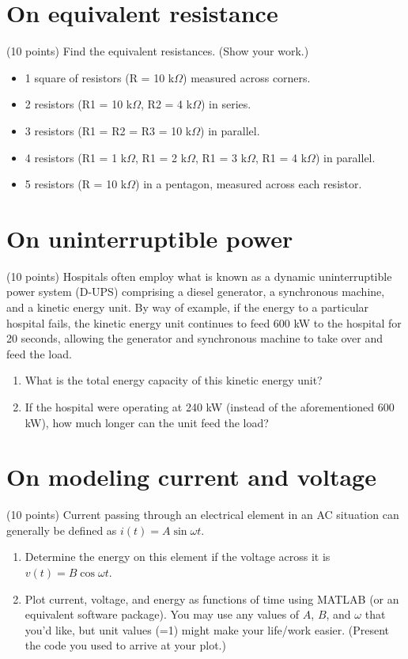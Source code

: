 \documentclass[11pt]{book}
\begin{document}
\section{On equivalent resistance}
(10 points) Find the equivalent resistances. (Show your work.)
\begin{itemize}
	\item 1 square of resistors (R = 10 k$\Omega$) measured across corners.
	\item 2 resistors (R1 = 10 k$\Omega$, R2 = 4 k$\Omega$) in series.
	\item 3 resistors (R1 = R2 = R3 = 10 k$\Omega$) in parallel.
	\item 4 resistors (R1 = 1 k$\Omega$, R1 = 2 k$\Omega$, R1 = 3 k$\Omega$, R1 = 4 k$\Omega$) in parallel.
	\item 5 resistors (R = 10 k$\Omega$) in a pentagon, measured across each resistor.
\end{itemize}

\section{On uninterruptible power}
(10 points) Hospitals often employ what is known as a dynamic uninterruptible power system (D-UPS) comprising a diesel generator, a synchronous machine, and a kinetic energy unit. By way of example, if the energy to a particular hospital fails, the kinetic energy unit continues to feed 600 kW to the hospital for 20 seconds, allowing the generator and synchronous machine to take over and feed the load.
\begin{enumerate}
	\item What is the total energy capacity of this kinetic energy unit?
	\item If the hospital were operating at 240 kW (instead of the aforementioned 600 kW), how much longer can the unit feed the load?
\end{enumerate}


\section{On modeling current and voltage}
(10 points) Current passing through an electrical element in an AC situation can generally be defined as $i(t) = A \sin \omega t$. 
\begin{enumerate}
	\item Determine the energy on this element if the voltage across it is 
\\
$v(t) = B \cos \omega t$.
	\item Plot current, voltage, and energy as functions of time using MATLAB (or an equivalent software package). You may use any values of $A$, $B$, and $\omega$ that you’d like, but unit values (=1) might make your life/work easier. (Present the code you used to arrive at your plot.)
\end{enumerate}
\end{document}
